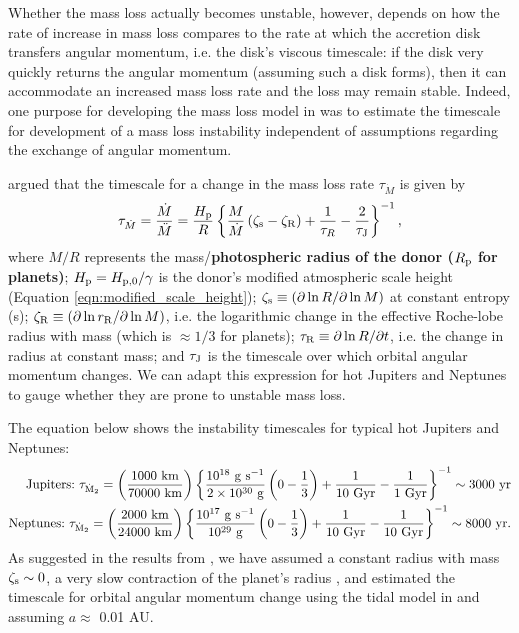 \documentclass{aastex}
\begin{document}
Whether the mass loss actually becomes unstable, however, depends on how the rate of increase in mass loss compares to the rate at which the accretion disk transfers angular momentum, i.e. the disk's viscous timescale: if the disk very quickly returns the angular momentum (assuming such a disk forms), then it can accommodate an increased mass loss rate and the loss may remain stable. Indeed, one purpose for developing the mass loss model in \citet{1988A&A...202...93R} was to estimate the timescale for development of a mass loss instability independent of assumptions regarding the exchange of angular momentum. 

\citet{1988A&A...202...93R} argued that the timescale for a change in the mass loss rate $\tau_{\dot{M}}$ is given by 
\begin{equation}
\tau_{\dot{M}} = \dfrac{\dot{M}}{\ddot{M}} = \dfrac{H_{\rm p}}{R} \left\{ \dfrac{M}{\dot{M}} \left( \zeta_{\rm s} - \zeta_{\rm R} \right) + \dfrac{1}{\tau_{R}} - \dfrac{2}{\tau_{\rm J}} \right\}^{-1}, 
\label{eqn:Ritters_instability_timescale}
\end{equation}
where $M/R$ represents the mass/{\bf photospheric radius of the donor ($R_{\rm p}$ for planets)}; $H_{\rm p} = H_{\rm p, 0}/\gamma$ is the donor's modified atmospheric scale height (Equation \ref{eqn:modified_scale_height}); $\zeta_{\rm s} \equiv \left( \partial \ln R/\partial \ln M \right)$ at constant entropy (s); $\zeta_{\rm R} \equiv \left(\partial\ln r_{\rm R}/\partial \ln M \right)$, i.e. the logarithmic change in the effective Roche-lobe radius with mass (which is $\approx 1/3$ for planets); $\tau_{\rm R} \equiv \partial \ln R/\partial t$, i.e. the change in radius at constant mass; and $\tau_{\rm J}$ is the timescale over which orbital angular momentum changes. We can adapt this expression for hot Jupiters and Neptunes to gauge whether they are prone to unstable mass loss. 

The equation below shows the instability timescales for typical hot Jupiters and Neptunes:
\begin{eqnarray}
\textrm{Jupiters:}\ \tau_{\rm \dot{M}_2} = \left( \dfrac{\rm 1000\ km}{\rm 70000\ km} \right) \left\{ \dfrac{10^{18}\ {\rm g\ s^{-1}}}{2\times10^{30}\ {\rm g}} \left(0 - \frac{1}{3} \right) + \dfrac{1}{\rm 10\ Gyr} - \dfrac{1}{1\ {\rm Gyr}}\right\}^{-1} \sim 3000\ {\rm yr} \nonumber \\
\textrm{Neptunes:}\ \tau_{\rm \dot{M}_2} = \left( \dfrac{\rm 2000\ km}{\rm 24000\ km} \right) \left\{ \dfrac{10^{17}\ {\rm g\ s^{-1}}}{10^{29}\ {\rm g}} \left(0 - \frac{1}{3} \right) + \dfrac{1}{\rm 10\ Gyr} - \dfrac{1}{10\ {\rm Gyr}}\right\}^{-1} \sim 8000\ {\rm yr}. \nonumber
\end{eqnarray}
As suggested in the results from \citet{2007ApJ...659.1661F}, we have assumed a constant radius with mass $\zeta_{\rm s} \sim 0$, a very slow contraction of the planet's radius \citep{2006ApJ...650..394A}, and estimated the timescale for orbital angular momentum change using the tidal model in \citet{2016arXiv160300392J} and assuming $a \approx$ 0.01 AU. 
\end{document}
